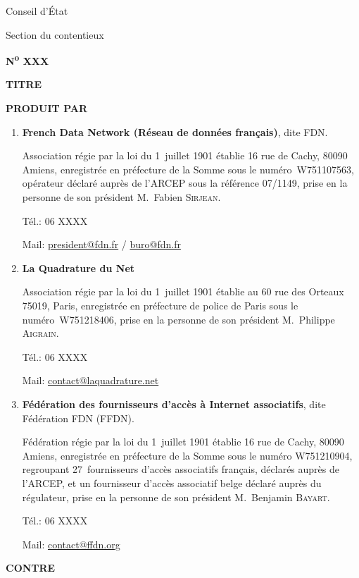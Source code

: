 \begin{titlepage}
\pagestyle{empty}
\begin{minipage}{5cm}\centering
Conseil d'État\par
Section du contentieux\par
\textbf{N\textsuperscript{o} XXX}
\end{minipage}

\vskip 1cm

\begin{center}\LARGE\bfseries
  TITRE
\end{center}

\vskip 1cm

\textbf{PRODUIT PAR}

\begin{enumerate}
\item \textbf{French Data Network (Réseau de données français)}, dite FDN.

Association    régie par la loi du 1\ier~juillet  1901 établie 16 rue de Cachy,  80090   Amiens, enregistrée en préfecture  de la Somme sous le    numéro~W751107563, opérateur déclaré auprès de  l'ARCEP sous la    référence 07/1149, prise en la personne de son président  M.~Fabien    \textsc{Sirjean}.

Tél.: 06 XXXX

Mail: \url{president@fdn.fr} / \url{buro@fdn.fr}

\item \textbf{La Quadrature du Net}

Association    régie par la loi du 1\ier~juillet  1901 établie au 60 rue des Orteaux    75019, Paris, enregistrée en  préfecture de police de Paris sous le    numéro~W751218406, prise en la  personne de son président M.~Philippe    \textsc{Aigrain}.

Tél.: 06 XXXX

Mail:  \url{contact@laquadrature.net}

\item \textbf{Fédération des fournisseurs d'accès à Internet associatifs}, dite Fédération FDN (FFDN).

Fédération    régie par la loi du 1\ier~juillet  1901 établie 16 rue de Cachy,  80090   Amiens, enregistrée en préfecture  de la Somme sous le numéro  W751210904, regroupant 27~fournisseurs   d'accès associatifs français,   déclarés auprès de l'ARCEP, et un   fournisseur d'accès associatif  belge  déclaré auprès du régulateur,  prise  en la personne de son  président  M.~Benjamin \textsc{Bayart}.

Tél.: 06 XXXX

Mail: \url{contact@ffdn.org}
\end{enumerate}

\vskip 1cm

       
\noindent\textbf{CONTRE}

\vskip 1cm

\textbf{}


\end{titlepage}


